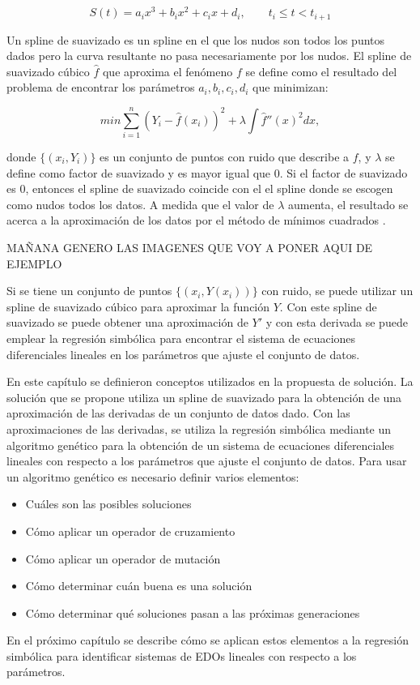$$S(t) = a_ix^3 + b_ix^2 + c_ix + d_i, \qquad t_i \leq t < t_{i+1}$$

Un spline de suavizado es un spline en el que los nudos son todos los puntos dados pero la curva resultante no pasa necesariamente por los nudos. El spline de suavizado cúbico $\hat{f}$ que aproxima el fenómeno $f$ se define como el resultado del problema de encontrar los parámetros $a_i, b_i, c_i, d_i$ que minimizan:

$$min \sum_{i=1}^n (Y_i - \hat{f}(x_i))^2 + \lambda \int \hat{f}''(x)^2 dx,$$

donde $\{(x_i, Y_i)\}$ es un conjunto de puntos con ruido que describe a $f$, y $\lambda$ se define como factor de suavizado y es mayor igual que 0. Si el factor de suavizado es 0, entonces el spline de suavizado coincide con el el spline donde se escogen como nudos todos los datos. A medida que el valor de $\lambda$ aumenta, el resultado se acerca a la aproximación de los datos por el método de mínimos cuadrados \cite{green1993nonparametric}.

MAÑANA GENERO LAS IMAGENES QUE VOY A PONER AQUI DE EJEMPLO

Si se tiene un conjunto de puntos $\{(x_i, Y(x_i))\}$ con ruido, se puede utilizar un spline de suavizado cúbico para aproximar la función $Y$. Con este spline de suavizado se puede obtener una aproximación de $Y'$ y con esta derivada se puede emplear la regresión simbólica para encontrar el sistema de ecuaciones diferenciales lineales en los parámetros que ajuste el conjunto de datos.

En este capítulo se definieron conceptos utilizados en la propuesta de solución. La solución que se propone utiliza un spline de suavizado para la obtención de una aproximación de las derivadas de un conjunto de datos dado. Con las aproximaciones de las derivadas, se utiliza la regresión simbólica mediante un algoritmo genético para la obtención de un sistema de ecuaciones diferenciales lineales con respecto a los parámetros que ajuste el conjunto de datos. Para usar un algoritmo genético es necesario definir varios elementos:

\begin{itemize}
    \item Cuáles son las posibles soluciones
    \item Cómo aplicar un operador de cruzamiento
    \item Cómo aplicar un operador de mutación
    \item Cómo determinar cuán buena es una solución
    \item Cómo determinar qué soluciones pasan a las próximas generaciones
\end{itemize}

En el próximo capítulo se describe cómo se aplican estos elementos a la regresión simbólica para identificar sistemas de EDOs lineales con respecto a los parámetros.

